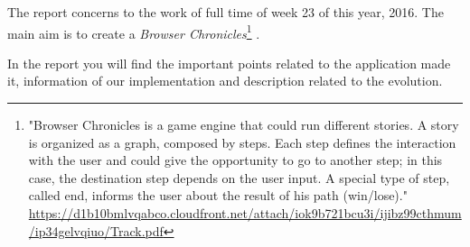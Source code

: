 The report concerns to the work of full time of week 23 of this year, 2016. The main aim is to create a \textit{Browser Chronicles}\footnote{"Browser Chronicles is a game engine that could run different  stories. 
A story is organized as a graph, composed by steps. Each step defines the interaction with the user and could give the opportunity to go to another step;  in this case, the destination step depends on the user input. A special type of step, called end, informs the user about the result of his path (win/lose)." \url{https://d1b10bmlvqabco.cloudfront.net/attach/iok9b721bcu3i/ijibz99cthmum/ip34gelvqiuo/Track.pdf}} .

In the report you will find the important points related to the application made it, information of our implementation and description related to the evolution.